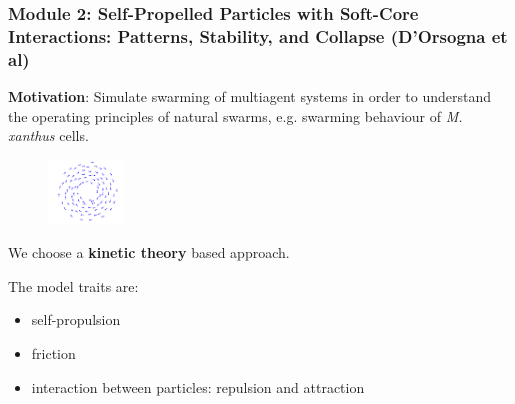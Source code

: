 \documentclass[compress]{beamer}
\begin{document}


\begin{frame}
  \frametitle{Module 2: Self-Propelled Particles with Soft-Core Interactions: Patterns, Stability, and Collapse (D'Orsogna et al)}
  
  \textbf{Motivation}: Simulate swarming of multiagent systems in order to understand the operating principles of natural swarms, e.g. swarming behaviour of \textit{M. xanthus} cells. \\ 
  
  
  \begin{figure}{}{\textwidth}
  	\centering
  		\includegraphics[width=0.18\textwidth]{./img/mill.png}
  \end{figure}


  We choose a \textbf{kinetic theory} based approach.\\

\hspace{3cm}

  The model traits are:
  \begin{itemize}
  	\item self-propulsion
  	\item friction 
  	\item interaction between particles: repulsion and attraction
  \end{itemize}
 
%

\end{frame}
\end{document}
